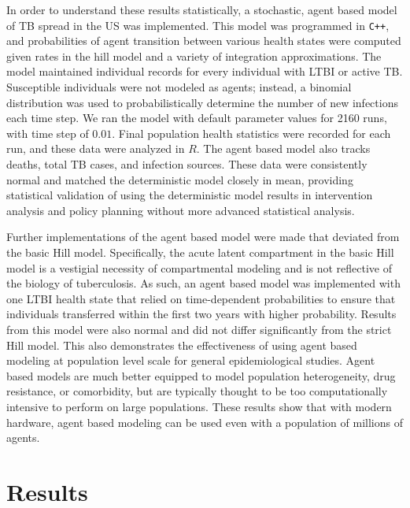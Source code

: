 \documentclass{amsart}
\renewcommand{\(}{\left(}
\renewcommand{\)}{\right)}
\begin{document}
In order to understand these results statistically, a stochastic, agent based
model of TB spread in the US was implemented. This model was programmed in
\texttt{C++}, and probabilities of agent transition between various health
states were computed given rates in the hill model and a variety of integration
approximations. The model maintained individual records for every individual
with LTBI or active TB. Susceptible individuals were not modeled as agents;
instead, a binomial distribution was used to probabilistically determine the
number of new infections each time step. We ran the model with default parameter
values for 2160 runs, with time step of $0.01$.  Final population health
statistics were recorded for each run, and these data were analyzed in $R$. The
agent based model also tracks deaths, total TB cases, and infection sources.
These data were consistently normal and matched the deterministic model closely
in mean, providing statistical validation of using the deterministic model
results in intervention analysis and policy planning without more advanced
statistical analysis.

Further implementations of the agent based model were made that deviated from
the basic Hill model. Specifically, the acute latent compartment in the basic
Hill model is a vestigial necessity of compartmental modeling and is not
reflective of the biology of tuberculosis. As such, an agent based model was
implemented with one LTBI health state that relied on time-dependent
probabilities to ensure that individuals transferred within the first two years
with higher probability.  Results from this model were also normal and did not
differ significantly from the strict Hill model. This also demonstrates the
effectiveness of using agent based modeling at population level scale for
general epidemiological studies. Agent based models are much better equipped to
model population heterogeneity, drug resistance, or comorbidity, but are
typically thought to be too computationally intensive to perform on large
populations. These results show that with modern hardware, agent based modeling
can be used even with a population of millions of agents.  

\section{Results}
\end{document}
